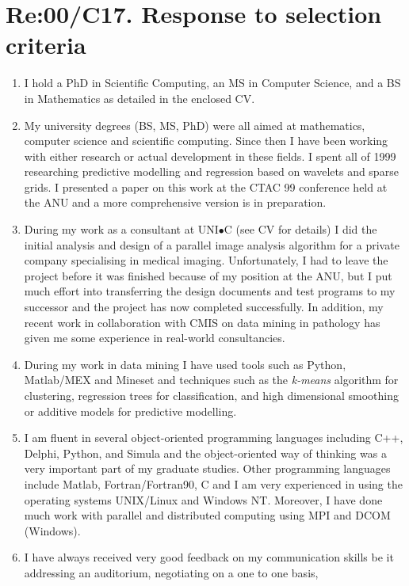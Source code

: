 \documentclass[12pt,a4paper]{article}
\begin{document}
\section*{Re:00/C17. Response to selection criteria}

\begin{enumerate} 
  \item I hold a PhD in Scientific Computing, an MS in Computer Science,
  and a BS in Mathematics as detailed in the enclosed CV.
 \item My university degrees (BS, MS, PhD) were all aimed at mathematics, 
  computer science and scientific computing. Since then I have been working
  with either research or actual development in these fields. 
  I spent all of 1999 researching predictive modelling 
  and regression based on wavelets and sparse grids. I presented a paper 
  on this work at the CTAC 99 conference held at the ANU
  and a more comprehensive version is in preparation.
  \item During my work as a consultant at UNI$\bullet$C (see CV for details) 
  I did the initial analysis and design of a parallel image analysis
  algorithm for a private company specialising in medical imaging.
  Unfortunately, I had to leave the project before it was finished
  because of my position at the ANU, but I put much effort into 
  transferring the design documents and test programs to 
  my successor and the project has now completed successfully.
  In addition, my recent work in collaboration with CMIS on 
  data mining in pathology has given me some experience in 
  real-world consultancies.
  \item During my work in data mining I have used tools such as
  Python, Matlab/MEX and Mineset and techniques such as the 
  {\em k-means} 
  algorithm for clustering, regression trees for classification,
  and high dimensional smoothing or additive models for
  predictive modelling.
  \item I am fluent in several object-oriented programming 
  languages including C++, Delphi, Python, and Simula and the 
  object-oriented way of thinking was a very important part of my 
  graduate studies.  
  Other programming languages include Matlab, Fortran/Fortran90, C
  and I am very experienced in using the operating systems 
  UNIX/Linux and Windows NT. 
  Moreover, I have done much work with parallel and distributed computing  
  using MPI and DCOM (Windows).
  \item I have always received very good feedback on my communication skills
  be it addressing an auditorium, negotiating on a one to one basis,

\end{enumerate}
\end{document}
